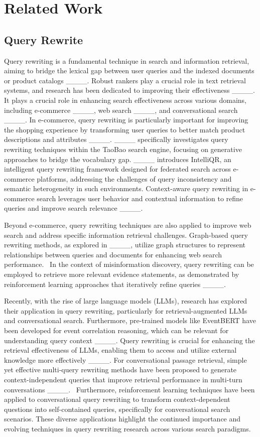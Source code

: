 \section{Related Work}
\subsection{Query Rewrite}

Query rewriting is a fundamental technique in search and information retrieval, aiming to bridge the lexical gap between user queries and the indexed documents or product catalogs ____.  Robust rankers play a crucial role in text retrieval systems, and research has been dedicated to improving their effectiveness ____.  It plays a crucial role in enhancing search effectiveness across various domains, including e-commerce ____, web search ____, and conversational search ____. In e-commerce, query rewriting is particularly important for improving the shopping experience by transforming user queries to better match product descriptions and attributes ____. ____ specifically investigates query rewriting techniques within the TaoBao search engine, focusing on generative approaches to bridge the vocabulary gap. ____ introduces IntelliQR, an intelligent query rewriting framework designed for federated search across e-commerce platforms, addressing the challenges of query inconsistency and semantic heterogeneity in such environments. Context-aware query rewriting in e-commerce search leverages user behavior and contextual information to refine queries and improve search relevance ____.

Beyond e-commerce, query rewriting techniques are also applied to improve web search and address specific information retrieval challenges. Graph-based query rewriting methods, as explored in ____, utilize graph structures to represent relationships between queries and documents for enhancing web search performance.  In the context of misinformation discovery, query rewriting can be employed to retrieve more relevant evidence statements, as demonstrated by reinforcement learning approaches that iteratively refine queries ____.

Recently, with the rise of large language models (LLMs), research has explored their application in query rewriting, particularly for retrieval-augmented LLMs and conversational search.  Furthermore, pre-trained models like EventBERT have been developed for event correlation reasoning, which can be relevant for understanding query context ____. Query rewriting is crucial for enhancing the retrieval effectiveness of LLMs, enabling them to access and utilize external knowledge more effectively ____.  For conversational passage retrieval, simple yet effective multi-query rewriting methods have been proposed to generate context-independent queries that improve retrieval performance in multi-turn conversations ____.  Furthermore, reinforcement learning techniques have been applied to conversational query rewriting to transform context-dependent questions into self-contained queries, specifically for conversational search scenarios. These diverse applications highlight the continued importance and evolving techniques in query rewriting research across various search paradigms.

